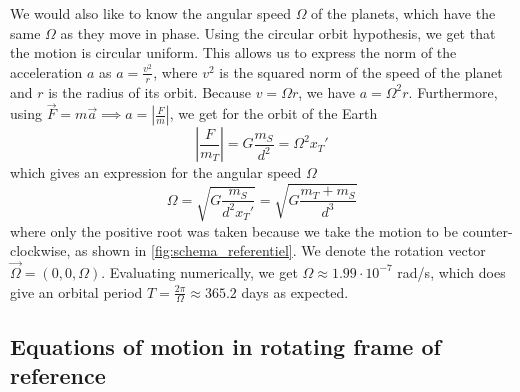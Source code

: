 We would also like to know the angular speed \(\Omega\) of the planets, which have the same $\Omega$ as they move in phase. Using the circular orbit hypothesis, we get that the motion is circular uniform. This allows us to express the norm of the acceleration \(a\) as \(a = \frac{v^2}{r}\), where \(v^2\) is the squared norm of the speed of the planet and \(r\) is the radius of its orbit. Because \(v = \Omega r\), we have \(a = \Omega^2 r\). Furthermore, using \(\vec F=m \vec a \implies a = \left|\frac{F}{m}\right|\), we get for the orbit of the Earth
\begin{equation}
    \left|\frac{F}{m_T}\right| = G \frac{m_S}{d^2} = \Omega^2 x_T'
\end{equation}
which gives an expression for the angular speed \(\Omega\)
\begin{equation}
    \Omega = \sqrt{G \frac{m_S}{d^2 x_T'}} = \sqrt{G\frac{m_T + m_S}{d^3}}
\end{equation}
where only the positive root was taken because we take the motion to be counter-clockwise, as shown in \autoref{fig:schema_referentiel}. We denote the rotation vector \(\vec\Omega = (0, 0, \Omega)\). Evaluating numerically, we get \(\Omega \approx 1.99 \cdot 10^{-7}\) rad/s, which does give an orbital period \(T = \frac{2 \pi}{\Omega} \approx 365.2\) days as expected.

\subsection{Equations of motion in rotating frame of reference}
\label{sec:3body_reduced}

